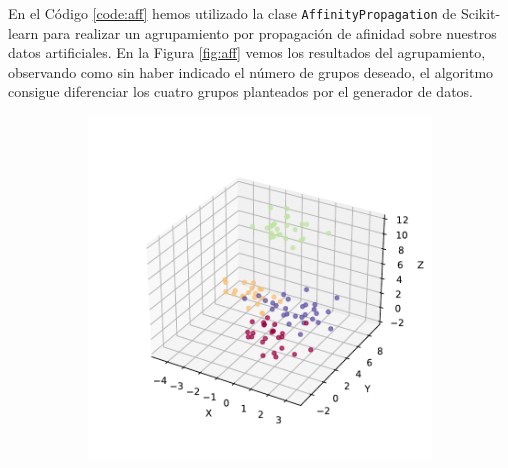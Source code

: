 En el Código \ref{code:aff} hemos utilizado la clase \texttt{AffinityPropagation} de Scikit-learn para realizar un agrupamiento por propagación de afinidad sobre nuestros datos artificiales. En la Figura \ref{fig:aff} vemos los resultados del agrupamiento, observando como sin haber indicado el número de grupos deseado, el algoritmo consigue diferenciar los cuatro grupos planteados por el generador de datos.

\begin{figure}[h]
  \centering
  \begin{subfigure}{0.45\textwidth}
    \centering
    \includegraphics[width=\textwidth]{figures/affinity-3d.pdf}
    \caption{}
    \label{fig:aff-3d}
  \end{subfigure}
  \begin{subfigure}{0.45\textwidth}
    \centering

\end{subfigure}
\end{figure}

